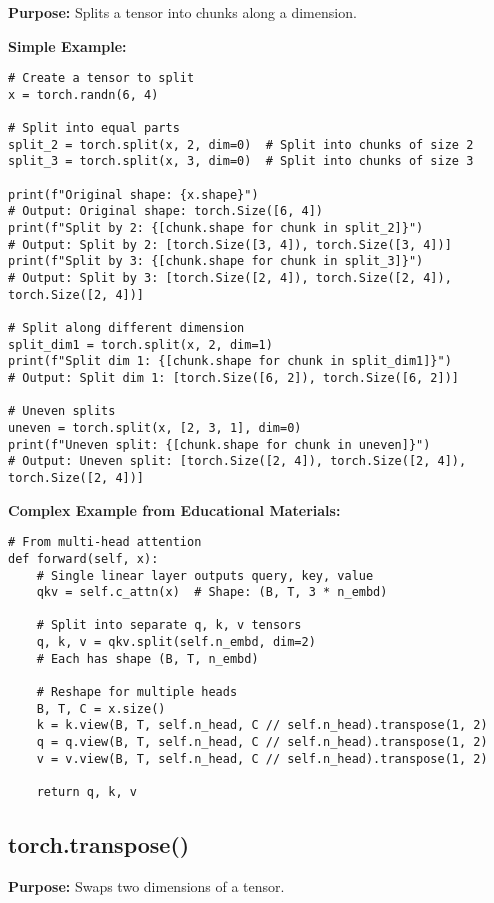 \documentclass[11pt,a4paper]{book}
\begin{document}
\textbf{Purpose:} Splits a tensor into chunks along a dimension.

\textbf{Simple Example:}
\begin{verbatim}
# Create a tensor to split
x = torch.randn(6, 4)

# Split into equal parts
split_2 = torch.split(x, 2, dim=0)  # Split into chunks of size 2
split_3 = torch.split(x, 3, dim=0)  # Split into chunks of size 3

print(f"Original shape: {x.shape}")
# Output: Original shape: torch.Size([6, 4])
print(f"Split by 2: {[chunk.shape for chunk in split_2]}")
# Output: Split by 2: [torch.Size([3, 4]), torch.Size([3, 4])]
print(f"Split by 3: {[chunk.shape for chunk in split_3]}")
# Output: Split by 3: [torch.Size([2, 4]), torch.Size([2, 4]), torch.Size([2, 4])]

# Split along different dimension
split_dim1 = torch.split(x, 2, dim=1)
print(f"Split dim 1: {[chunk.shape for chunk in split_dim1]}")
# Output: Split dim 1: [torch.Size([6, 2]), torch.Size([6, 2])]

# Uneven splits
uneven = torch.split(x, [2, 3, 1], dim=0)
print(f"Uneven split: {[chunk.shape for chunk in uneven]}")
# Output: Uneven split: [torch.Size([2, 4]), torch.Size([2, 4]), torch.Size([2, 4])]
\end{verbatim}

\textbf{Complex Example from Educational Materials:}
\begin{verbatim}
# From multi-head attention
def forward(self, x):
    # Single linear layer outputs query, key, value
    qkv = self.c_attn(x)  # Shape: (B, T, 3 * n_embd)
    
    # Split into separate q, k, v tensors
    q, k, v = qkv.split(self.n_embd, dim=2)
    # Each has shape (B, T, n_embd)
    
    # Reshape for multiple heads
    B, T, C = x.size()
    k = k.view(B, T, self.n_head, C // self.n_head).transpose(1, 2)
    q = q.view(B, T, self.n_head, C // self.n_head).transpose(1, 2)
    v = v.view(B, T, self.n_head, C // self.n_head).transpose(1, 2)
    
    return q, k, v
\end{verbatim}

\subsection{torch.transpose()}

\textbf{Purpose:} Swaps two dimensions of a tensor.
\end{document}
